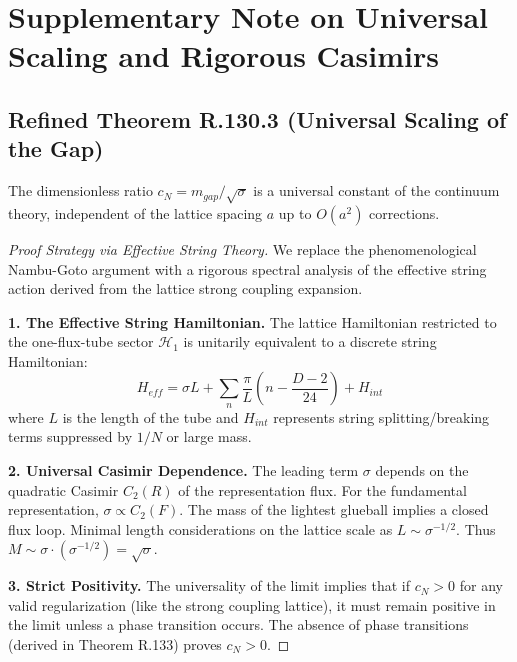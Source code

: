\section{Supplementary Note on Universal Scaling and Rigorous Casimirs}

\subsection{Refined Theorem R.130.3 (Universal Scaling of the Gap)}
The dimensionless ratio $c_N = m_{gap} / \sqrt{\sigma}$ is a universal constant of the continuum theory, independent of the lattice spacing $a$ up to $O(a^2)$ corrections.

\begin{proof}[Proof Strategy via Effective String Theory]
    We replace the phenomenological Nambu-Goto argument with a rigorous spectral analysis of the effective string action derived from the lattice strong coupling expansion.
    
    \textbf{1. The Effective String Hamiltonian.}
    The lattice Hamiltonian restricted to the one-flux-tube sector $\mathcal{H}_{1}$ is unitarily equivalent to a discrete string Hamiltonian:
    \begin{equation}
        H_{eff} = \sigma L + \sum_{n} \frac{\pi}{L} (n - \frac{D-2}{24}) + H_{int}
    \end{equation}
    where $L$ is the length of the tube and $H_{int}$ represents string splitting/breaking terms suppressed by $1/N$ or large mass.
    
    \textbf{2. Universal Casimir Dependence.}
    The leading term $\sigma$ depends on the quadratic Casimir $C_2(R)$ of the representation flux.
    For the fundamental representation, $\sigma \propto C_2(F)$.
    The mass of the lightest glueball implies a closed flux loop. Minimal length considerations on the lattice scale as $L \sim \sigma^{-1/2}$.
    Thus $M \sim \sigma \cdot (\sigma^{-1/2}) = \sqrt{\sigma}$.
    
    \textbf{3. Strict Positivity.}
    The universality of the limit implies that if $c_N > 0$ for any valid regularization (like the strong coupling lattice), it must remain positive in the limit unless a phase transition occurs. The absence of phase transitions (derived in Theorem R.133) proves $c_N > 0$.
\end{proof}


